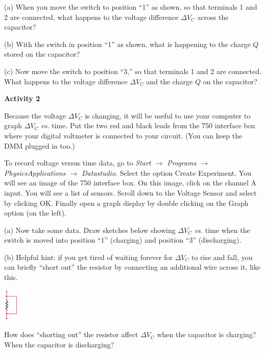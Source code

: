 (a) When you move the switch to position ``1'' as shown, so that terminals 1 and 2 are connected, what happens to the voltage difference $\Delta V_C$ across the capacitor?
\vspace{0.6in}

(b)  With the switch in position ``1'' as shown, what is happening to the charge $Q$ stored on the capacitor?
\vspace{0.6in}

(c)  Now move the switch to position ``3,'' so that terminals 1 and 2 are connected.  What happens to the voltage difference $\Delta V_C$ and the charge $Q$ on the capacitor?
\vspace{0.8in}

\pagebreak
\textbf{Activity 2}

Because the voltage $\Delta V_C$ is changing, it will be useful to use your computer to graph $\Delta V_C$ \textit{vs.} time.  Put the two red and black leads from the 750 interface box where your digital voltmeter is connected to your circuit.  (You can keep the DMM plugged in too.)

To record voltage versus time data, go to \textit{Start $\longrightarrow$ Programs $\longrightarrow$ PhysicsApplications $\longrightarrow$ Datastudio}. Select the option Create Experiment.  You will see an image of the 750 interface box.  On this image, click on the channel A input.  You will see a list of sensors.  Scroll down to the Voltage Sensor and select by clicking OK.  Finally open a graph display by double clicking on the Graph option (on the left).

(a)  Now take some data.  Draw sketches below showing $\Delta V_C$ \textit{vs.} time when the switch is moved into position ``1'' (charging) and position ``3'' (discharging).
\vspace{1.5in}

(b)  Helpful hint: if you get tired of waiting forever for $\Delta V_C$ to rise and fall, you can briefly “short out” the resistor by connecting an additional wire across it, like this.  
\begin{center}
\vspace{-0.2 in}
\includegraphics[width=0.05\textwidth]{rc_circuits/shorted_resistor.eps}
\vspace{-0.2 in}
\end{center}
How does “shorting out” the resistor affect $\Delta V_C$ when the capacitor is charging?  When the capacitor is discharging?
\vspace{0.8in}


